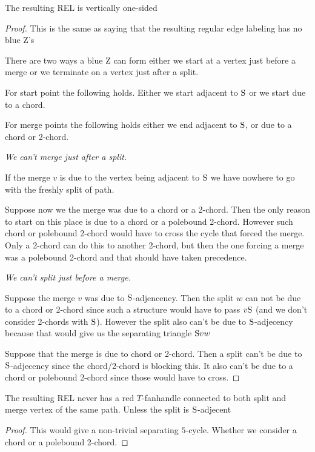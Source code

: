     \begin{lemma}
      \label{lm:sweep:vertOnsided}
      The resulting REL is vertically one-sided
    \end{lemma}
    \begin{proof}
      This is the same as saying that the resulting regular edge labeling has no blue Z's

      There are two ways a blue Z can form either we start at a vertex just before a merge or we terminate on a vertex just after a split.

      For start point the following holds. Either we start adjacent to $\mathrm{S}$ or we start due to a chord.

      For merge points the following holds either we end adjacent to $\mathrm{S}$, or due to a chord or 2-chord.

      \vspace{2ex}
      \emph{We can't merge just after a split.}

      If the merge $v$ is due to the vertex being adjacent to $\mathrm{S}$ we have nowhere to go with the freshly split of path. 

      Suppose now we the merge was due to a chord or a 2-chord. Then the only reason to start on this place is due to a chord or a polebound 2-chord. However such chord or polebound 2-chord would have to cross the cycle that forced the merge. Only a 2-chord can do this to another 2-chord, but then the one forcing a merge was a polebound 2-chord and that should have taken precedence.


      \vspace{2ex}
      \emph{We can't split just before a merge.}

      Suppose the merge $v$ was due to $\mathrm{S}$-adjencency. Then the split $w$ can not be due to a chord or 2-chord since such a structure would have to pass $v \mathrm{S}$ (and we don't consider 2-chords with $\mathrm{S}$). However the split also can't be due to $\mathrm{S}$-adjecency because that would give us the separating triangle $\mathrm{S} v w$

      Suppose that the merge is due to chord or 2-chord. Then a split can't be due to $\mathrm{S}$-adjecency since the chord/2-chord is blocking this. It also can't be due to a chord or polebound 2-chord since those would have to cross.
    \end{proof}

    \begin{lemma}
      \label{lm:uni:noTfan above whole path}
      The resulting REL never has a red $T$-fanhandle connected to both split and merge vertex of the same path. Unless the split is $\mathrm{S}$-adjecent
    \end{lemma}
    \begin{proof}
        This would give a non-trivial separating $5$-cycle. Whether we consider a chord or a polebound 2-chord.
    \end{proof}

